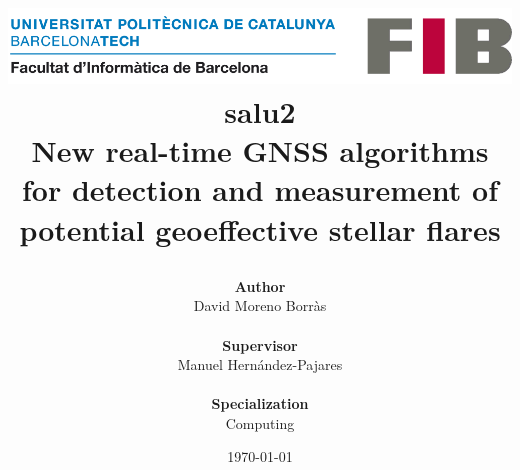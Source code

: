 \title{
	{
	\includegraphics[width=0.7\linewidth]{images/logo-fib.png}	
	\vspace{1cm}
	\textbf{\\salu2} \\
	\large New real-time GNSS algorithms for detection and measurement of potential geoeffective stellar flares}
\author{\textbf{Author}\\
	David Moreno Borr\`as
	\\ \\
	\textbf{Supervisor}\\
	 Manuel Hernández-Pajares
	 \\ \\
	\textbf{Specialization}\\
	Computing
} 
	\vspace{1.3cm}
\date{\today}
}
\maketitle
\thispagestyle{empty}